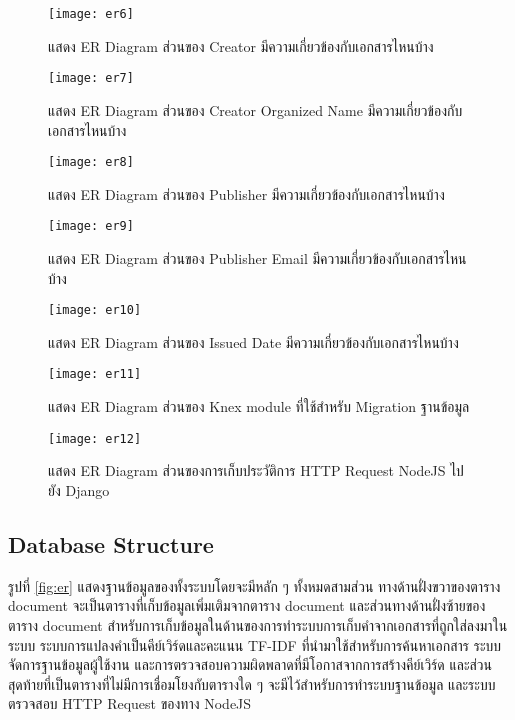 \begin{figure}[H]
    \centering
    \texttt{[image: er6]}
    \caption{แสดง ER Diagram ส่วนของ Creator มีความเกี่ยวข้องกับเอกสารไหนบ้าง}\label{fig:er6}
\end{figure}



\begin{figure}[H]
    \centering
    \texttt{[image: er7]}
    \caption{แสดง ER Diagram ส่วนของ Creator Organized Name มีความเกี่ยวข้องกับเอกสารไหนบ้าง}\label{fig:er7}
\end{figure}



\begin{figure}[H]
    \centering
    \texttt{[image: er8]}
    \caption{แสดง ER Diagram ส่วนของ Publisher มีความเกี่ยวข้องกับเอกสารไหนบ้าง}\label{fig:er8}
\end{figure}



\begin{figure}[H]
    \centering
    \texttt{[image: er9]}
    \caption{แสดง ER Diagram ส่วนของ Publisher Email มีความเกี่ยวข้องกับเอกสารไหนบ้าง}\label{fig:er9}
\end{figure}



\begin{figure}[H]
    \centering
    \texttt{[image: er10]}
    \caption{แสดง ER Diagram ส่วนของ Issued Date มีความเกี่ยวข้องกับเอกสารไหนบ้าง}\label{fig:er10}
\end{figure}



\begin{figure}[H]
    \centering
    \texttt{[image: er11]}
    \caption{แสดง ER Diagram ส่วนของ Knex module ที่ใช้สำหรับ Migration ฐานข้อมูล}\label{fig:er11}
\end{figure}



\begin{figure}[H]
    \centering
    \texttt{[image: er12]}
    \caption{แสดง ER Diagram ส่วนของการเก็บประวัติการ HTTP Request NodeJS ไปยัง Django}\label{fig:er12}
\end{figure}

\subsection{Database Structure}
รูปที่ \ref{fig:er} แสดงฐานข้อมูลของทั้งระบบโดยจะมีหลัก ๆ ทั้งหมดสามส่วน ทางด้านฝั่งขวาของตาราง document จะเป็นตารางที่เก็บข้อมูลเพิ่มเติมจากตาราง document และส่วนทางด้านฝั่งซ้ายของตาราง document สำหรับการเก็บข้อมูลในด้านของการทำระบบการเก็บคำจากเอกสารที่ถูกใส่ลงมาในระบบ ระบบการแปลงคำเป็นคีย์เวิร์ดและคะแนน TF-IDF ที่นำมาใช้สำหรับการค้นหาเอกสาร ระบบจัดการฐานข้อมูลผู้ใช้งาน และการตรวจสอบความผิดพลาดที่มีโอกาสจากการสร้างคีย์เวิร์ด และส่วนสุดท้ายที่เป็นตารางที่ไม่มีการเชื่อมโยงกับตารางใด ๆ จะมีไว้สำหรับการทำระบบฐานข้อมูล และระบบตรวจสอบ HTTP Request ของทาง NodeJS

